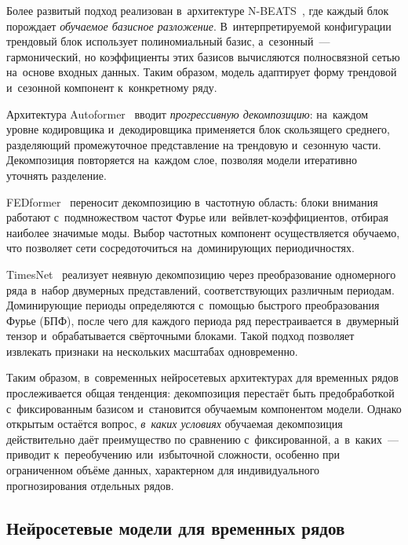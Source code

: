 Более развитый подход реализован в~архитектуре N-BEATS~\cite{oreshkin2020nbeats},
где каждый блок порождает \textit{обучаемое базисное разложение}.  В~интерпретируемой конфигурации трендовый блок
использует полиномиальный базис, а~сезонный~--- гармонический, но
коэффициенты этих базисов вычисляются полносвязной сетью на~основе
входных данных.  Таким образом, модель адаптирует форму трендовой
и~сезонной компонент к~конкретному ряду.

Архитектура Autoformer~\cite{wu2021autoformer} вводит \textit{прогрессивную
декомпозицию}: на~каждом уровне кодировщика и~декодировщика применяется
блок скользящего среднего, разделяющий промежуточное представление на
трендовую и~сезонную части.  Декомпозиция повторяется на~каждом слое,
позволяя модели итеративно уточнять разделение.

FEDformer~\cite{zhou2022fedformer} переносит декомпозицию в~частотную
область: блоки внимания работают с~подмножеством частот Фурье
или~вейвлет-коэффициентов, отбирая наиболее значимые моды.  Выбор
частотных компонент осуществляется обучаемо, что позволяет сети
сосредоточиться на~доминирующих периодичностях.

TimesNet~\cite{wu2023timesnet} реализует неявную декомпозицию через
преобразование одномерного ряда в~набор двумерных представлений,
соответствующих различным периодам.  Доминирующие периоды определяются
с~помощью быстрого преобразования Фурье (БПФ), после чего для каждого
периода ряд перестраивается в~двумерный тензор и~обрабатывается
свёрточными блоками.  Такой подход позволяет извлекать признаки на
нескольких масштабах одновременно.

Таким образом, в~современных нейросетевых архитектурах для временных
рядов прослеживается общая тенденция: декомпозиция перестаёт быть
предобработкой с~фиксированным базисом и~становится обучаемым
компонентом модели.  Однако открытым остаётся вопрос, \textit{в~каких
условиях} обучаемая декомпозиция действительно даёт преимущество по
сравнению с~фиксированной, а~в~каких~--- приводит к~переобучению
или~избыточной сложности, особенно при ограниченном объёме данных,
характерном для индивидуального прогнозирования отдельных рядов.


\subsection{Нейросетевые модели для временных рядов}
\label{subsec:neural-models}

